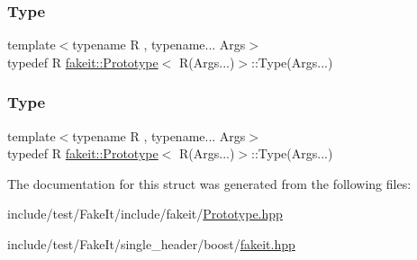 \subsubsection{\texorpdfstring{Type}{Type}\hspace{0.1cm}{\footnotesize\ttfamily [8/9]}}
{\footnotesize\ttfamily template$<$typename R , typename... Args$>$ \\
typedef R \mbox{\hyperlink{structfakeit_1_1Prototype}{fakeit\+::\+Prototype}}$<$ R(Args...)$>$\+::Type(Args...)}

\mbox{\label{structfakeit_1_1Prototype_3_01R_07Args_8_8_8_08_4_ab60f23ae5c02a3a715e1b7d959a1f502}} 
\subsubsection{\texorpdfstring{Type}{Type}\hspace{0.1cm}{\footnotesize\ttfamily [9/9]}}
{\footnotesize\ttfamily template$<$typename R , typename... Args$>$ \\
typedef R \mbox{\hyperlink{structfakeit_1_1Prototype}{fakeit\+::\+Prototype}}$<$ R(Args...)$>$\+::Type(Args...)}



The documentation for this struct was generated from the following files\+:\begin{DoxyCompactItemize}
\item 
include/test/\+Fake\+It/include/fakeit/\mbox{\hyperlink{Prototype_8hpp}{Prototype.\+hpp}}\item 
include/test/\+Fake\+It/single\+\_\+header/boost/\mbox{\hyperlink{single__header_2boost_2fakeit_8hpp}{fakeit.\+hpp}}\end{DoxyCompactItemize}
